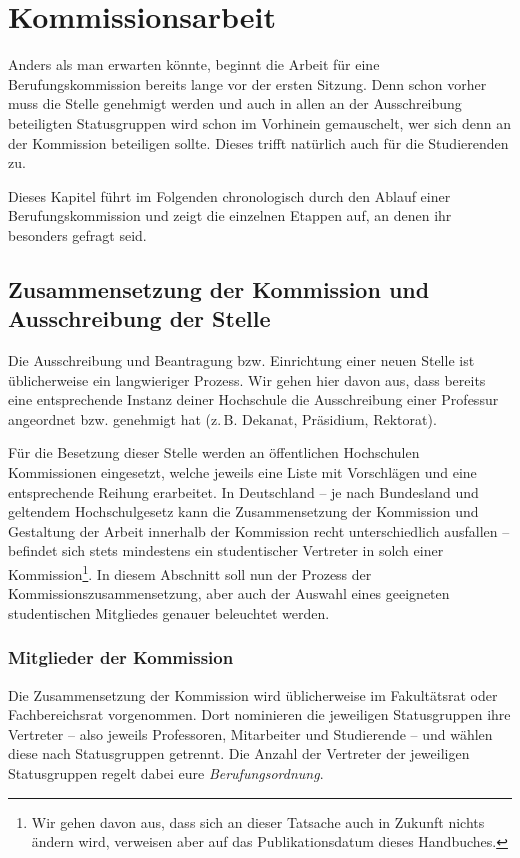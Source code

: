 \documentclass[10pt,twoside,a5paper,openright]{book}
\begin{document}


\chapter{Kommissionsarbeit}\thispagestyle{fancy}
Anders als man erwarten könnte, beginnt die Arbeit für eine Berufungskommission bereits lange vor der ersten Sitzung. Denn schon vorher muss die Stelle genehmigt werden und auch in allen an der Ausschreibung beteiligten Statusgruppen wird schon im Vorhinein gemauschelt, wer sich denn an der Kommission beteiligen sollte. Dieses trifft natürlich auch für die Studierenden zu.

Dieses Kapitel führt im Folgenden chronologisch durch den Ablauf einer Berufungskommission und zeigt die einzelnen Etappen auf, an denen ihr besonders gefragt seid.


\section[Zusammensetzung und Ausschreibung]{Zusammensetzung der Kommission und Ausschreibung der Stelle}
Die Ausschreibung und Beantragung bzw. Einrichtung einer neuen Stelle ist üblicherweise ein langwieriger Prozess. Wir gehen hier davon aus, dass bereits eine entsprechende Instanz deiner Hochschule die Ausschreibung einer Professur angeordnet bzw. genehmigt hat (z.\,B. Dekanat, Präsidium, Rektorat).

Für die Besetzung dieser Stelle werden an öffentlichen Hochschulen Kommissionen eingesetzt, welche jeweils eine Liste mit Vorschlägen und eine entsprechende Reihung erarbeitet. In Deutschland -- je nach Bundesland und geltendem Hochschulgesetz kann die Zusammensetzung der Kommission und Gestaltung der Arbeit innerhalb der Kommission recht unterschiedlich ausfallen -- befindet sich stets mindestens ein studentischer Vertreter in solch einer Kommission\footnote{Wir gehen davon aus, dass sich an dieser Tatsache auch in Zukunft nichts ändern wird, verweisen aber auf das Publikationsdatum dieses Handbuches.}. In diesem Abschnitt soll nun der Prozess der Kommissionszusammensetzung, aber auch der Auswahl eines geeigneten studentischen Mitgliedes genauer beleuchtet werden.

\subsection{Mitglieder der Kommission} 
Die Zusammensetzung der Kommission wird üblicherweise im Fakultätsrat oder Fachbereichsrat vorgenommen. Dort nominieren die jeweiligen Statusgruppen ihre Vertreter -- also jeweils Professoren, Mitarbeiter und Studierende -- und wählen diese nach Statusgruppen getrennt. Die Anzahl der Vertreter der jeweiligen Statusgruppen regelt dabei eure \emph{Berufungsordnung}. 
\end{document}
